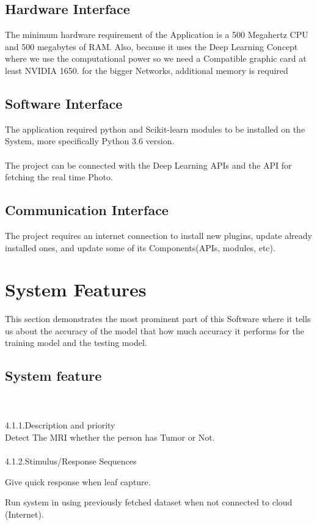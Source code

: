 \documentclass{article}
\begin{document}
\subsection{Hardware Interface }
The minimum hardware requirement of the Application is a 500 Megahertz CPU and 500 megabytes of RAM.
Also, because it uses the Deep Learning Concept where we use the computational power so we need a Compatible
graphic card at least NVIDIA 1650. for the bigger Networks, additional memory is required
\subsection{Software Interface}
The application required python and Scikit-learn modules to be installed on the System, more specifically Python
3.6 version.\\\\
The project can be connected with the Deep Learning APIs and the API for fetching the real time Photo. 
\subsection{Communication Interface}
The project requires an internet connection to install new plugins, update already installed ones, and update some
of its Components(APIs, modules, etc). 
\section{\textbf{System Features}}
This section demonstrates the most prominent part of this Software where it tells us about the accuracy of the
model that how much accuracy it performs for the training model and the testing model.\\
\subsection{\textbf{System feature}}\\\\
\large
4.1.1.Description and priority\\
 Detect The MRI whether the person has Tumor or Not.\\\\
4.1.2.Stimulus/Response Sequences
\item Give quick response when leaf capture.
\item  Run system in using previously fetched dataset when not connected to cloud (Internet). \\
\end{document}
